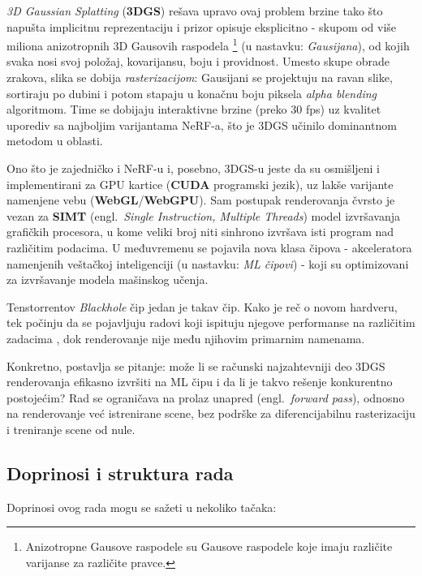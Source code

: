 \documentclass[12pt]{article}
\begin{document}
   \textit{3D Gaussian Splatting} \cite{gaussian_splatting} (\textbf{3DGS})
   rešava upravo ovaj problem brzine tako što napušta implicitnu reprezentaciju i
   prizor opisuje eksplicitno - skupom od više miliona anizotropnih
   3D Gausovih raspodela \footnote{Anizotropne Gausove raspodele su Gausove raspodele koje imaju različite varijanse za različite pravce.} (u nastavku: \emph{Gausijana}), od kojih
   svaka nosi svoj položaj, kovarijansu, boju i providnost. Umesto skupe
   obrade zrakova, slika se dobija \emph{rasterizacijom}: Gausijani se
   projektuju na ravan slike, sortiraju po dubini i potom stapaju u konačnu boju
   piksela \textit{alpha blending} algoritmom. Time
   se dobijaju interaktivne brzine (preko 30 fps) uz kvalitet uporediv
   sa najboljim varijantama NeRF-a, što je 3DGS učinilo dominantnom
   metodom u oblasti.

   \newpage
   Ono što je zajedničko i NeRF-u i, posebno, 3DGS-u jeste da su osmišljeni i
   implementirani za GPU kartice (\textbf{CUDA} programski jezik), uz lakše varijante namenjene vebu (\textbf{WebGL}/\textbf{WebGPU}). Sam postupak
   renderovanja čvrsto je vezan za \textbf{SIMT} (engl.\ \textit{Single Instruction, Multiple Threads}) model izvršavanja
   grafičkih procesora, u kome veliki broj niti
   sinhrono izvršava isti program nad različitim podacima. U međuvremenu se
   pojavila nova klasa čipova - akceleratora namenjenih veštačkoj inteligenciji (u nastavku: \emph{ML čipovi}) -
   koji su optimizovani za izvršavanje modela mašinskog učenja.

   Tenstorrentov \textit{Blackhole} čip jedan je takav čip. Kako je reč o
   novom hardveru, tek počinju da se pojavljuju radovi koji ispituju njegove performanse
   na različitim zadacima \cite{tt_nbody, tt_fft, tt_numerical},
   dok renderovanje nije među njihovim primarnim namenama.

   Konkretno, postavlja se pitanje: može li se računski najzahtevniji deo
   3DGS renderovanja efikasno izvršiti na ML čipu i da li je takvo
   rešenje konkurentno postojećim? Rad se ograničava na prolaz unapred (engl.\ \textit{forward pass}),
   odnosno na renderovanje već istrenirane scene, bez podrške za diferencijabilnu
   rasterizaciju i treniranje scene od nule.

   \subsection{Doprinosi i struktura rada}

   Doprinosi ovog rada mogu se sažeti u nekoliko tačaka:
\end{document}
